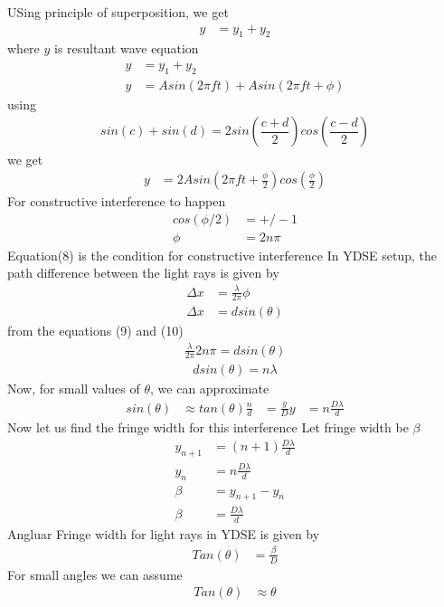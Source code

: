 \documentclass[journal,12pt,twocolumn]{IEEEtran}
\theoremstyle{remark}
\begin{document}
USing principle of superposition, we get
\begin{align}
y &= y_1+y_2
\end{align}
where $y$ is resultant wave equation
\begin{align}
y& = y_1+ y_2\\
y&= A sin(2\pi f t)+ A sin (2\pi f t+\phi)
\end{align}
using
\begin{align}
sin(c)+sin(d)= 2sin(\dfrac{c+d}{2})cos(\dfrac{c-d}{2})
\end{align}
we get
\begin{align}
y&=2Asin(2\pi f t+\frac{\phi}{2})cos(\frac{\phi}{2})
\end{align}
For constructive interference to happen 
\begin{align}
cos(\phi/2)&= +/- 1\\
\phi&= 2 n \pi
\end{align}
Equation(8) is the condition for constructive interference
 In YDSE setup, the path difference between the light rays is given by 
 \begin{align}
 \Delta x&= \frac{\lambda}{2\pi}\phi\\
 \Delta x&= d sin(\theta)
 \end{align}
 from the equations (9) and (10)
 \begin{align}
 \frac{\lambda}{2\pi}2 n \pi= d sin(\theta)
 \end{align}
 \begin{align}
     d sin(\theta)= n\lambda
 \end{align}
 Now, for small values of $\theta$, we can approximate 
\begin{align}
    sin(\theta)&\approx tan(\theta)
    \frac{n}{d}&=\frac{y}{D}
    y&=n\frac{D \lambda}{d}
\end{align}
 Now let us find the fringe width for this interference
 Let fringe width be $\beta$
 \begin{align}
 y_{n+1}&=(n+1)\frac{D\lambda}{d}\\
     y_n&=n\frac{D\lambda}{d}\\
     \beta&= y_{n+1}-y_n\\
     \beta&=\frac{D\lambda}{d}
 \end{align}
 Angluar Fringe width for light rays in YDSE is given by 
 \begin{align}
     Tan(\theta)&=\frac{\beta}{D}
 \end{align}
 For small angles we can assume 
 \begin{align}
     Tan(\theta)&\approx \theta
\end{align}
\end{document}
